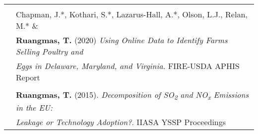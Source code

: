 \documentclass[letterpaper,11pt,oneside]{article}\usepackage[]{graphicx}\usepackage[]{xcolor}
\begin{document}
\begin{tabular}{p{1.2in} l}
                    & \\
                        & Chapman, J.*, Kothari, S.*, Lazarus-Hall, A.*, Olson, L.J., Relan, M.* \& \\
                        & \textbf{Ruangmas, T.} (2020) \textit{Using Online Data to Identify Farms Selling Poultry and} \\
                        & \textit{Eggs in Delaware, Maryland, and Virginia.} FIRE-USDA APHIS Report\\
                        & \\
                        & \textbf{Ruangmas, T.} (2015). \textit{Decomposition of SO\textsubscript{2} and NO\textsubscript{x} Emissions in the EU:}  \\
                        &  \textit{Leakage or Technology Adoption?}. IIASA YSSP Proceedings \href{https://previous.iiasa.ac.at/web/scientificUpdate/2014/Ruangmas_Thanicha.html}{\color{blue}{[LINK]}} \\
\end{tabular}
\end{document}
